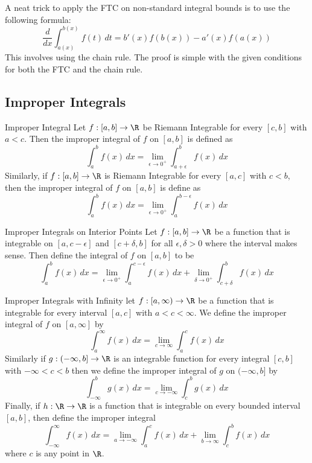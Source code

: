 A neat trick to apply the FTC on non-standard integral bounds is to use the following formula: $$\frac{d}{dx}\int_{a(x)}^{b(x)}f(t)\,dt=b'(x)f(b(x))-a'(x)f(a(x))$$ This involves using the chain rule. The proof is simple with the given conditions for both the FTC and the chain rule. 

\subsection{Improper Integrals}
\begin{defn}{Improper Integral}{} Let $f:[a,b]\to\R$ be Riemann Integrable for every $[c,b]$ with $a<c$. Then the improper integral of $f$ on $[a,b]$ is defined as $$\int_a^bf(x)\,dx=\lim_{\epsilon\to0^+}\int_{a+\epsilon}^bf(x)\,dx $$
Similarly, if $f:[a,b]\to\R$ is Riemann Integrable for every $[a,c]$ with $c<b$, then the improper integral of $f$ on $[a,b]$ is define as $$\int_a^bf(x)\,dx=\lim_{\epsilon\to0^+}\int_a^{b-\epsilon}f(x)\,dx$$
\end{defn}

\begin{defn}{Improper Integrals on Interior Points}{} Let $f:[a,b]\to\R$ be a function that is integrable on $[a,c-\epsilon]$ and $[c+\delta,b]$ for all $\epsilon,\delta>0$ where the interval makes sense. Then define the integral of $f$ on $[a,b]$ to be $$\int_a^bf(x)\,dx=\lim_{\epsilon\to0^+}\int_a^{c-\epsilon}f(x)\,dx+\lim_{\delta\to0^+}\int_{c+\delta}^bf(x)\,dx$$
\end{defn}

\begin{defn}{Improper Integrals with Infinity}{} let $f:[a,\infty)\to\R$ be a function that is integrable for every interval $[a,c]$ with $a<c<\infty$. We define the improper integral of $f$ on $[a,\infty]$ by $$\int_{a}^{\infty}f(x)\,dx=\lim_{c\to\infty}\int_{a}^{c}f(x)\,dx$$
Similarly if $g:(-\infty,b]\to\R$ is an integrable function for every integral $[c,b]$ with $-\infty<c<b$ then we define the improper integral of $g$ on $(-\infty,b]$ by $$\int_{-\infty}^{b}g(x)\,dx=\lim_{c\to-\infty}\int_{c}^{b}g(x)\,dx$$
Finally, if $h:\R\to\R$ is a function that is integrable on every bounded interval $[a,b]$, then define the improper integral $$\int_{-\infty}^\infty f(x)\,dx=\lim_{a\to-\infty}\int_a^cf(x)\,dx+\lim_{b\to\infty}\int_c^bf(x)\,dx$$ where $c$ is any point in $\R$. 
\end{defn}

